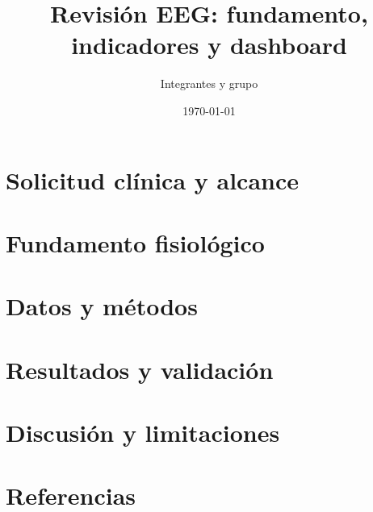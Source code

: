 \documentclass[11pt,a4paper]{article}
\title{Revisión EEG: fundamento, indicadores y dashboard}
\author{Integrantes y grupo}
\date{\today}
\begin{document}
\maketitle
\section{Solicitud clínica y alcance}
\section{Fundamento fisiológico}
\section{Datos y métodos}
\section{Resultados y validación}
\section{Discusión y limitaciones}
\section{Referencias}
\end{document}
